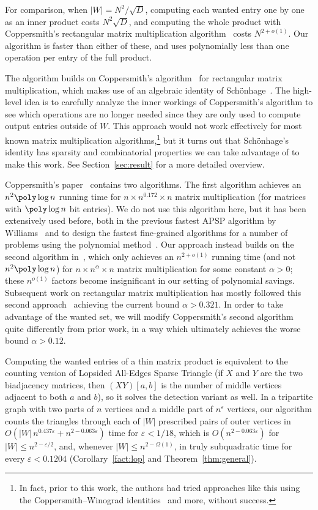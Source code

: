 For comparison, when $|W| = N^2/\sqrt D$, computing each wanted entry one by one as an inner product costs $N^2\sqrt D$, and computing the whole product with Coppersmith's rectangular matrix multiplication algorithm~\cite{Cop82} costs $N^{2+o(1)}$. Our algorithm is faster than either of these, and uses polynomially less than one operation per entry of the full product.

The algorithm builds on Coppersmith's algorithm~\cite{Cop82} for rectangular matrix multiplication, which makes use of an algebraic identity of Sch\"onhage~\cite{Sch81}. The high-level idea is to carefully analyze the inner workings of Coppersmith's algorithm to see which operations are no longer needed since they are only used to compute output entries outside of $W$. This approach would not work effectively for most known matrix multiplication algorithms,\footnote{In fact, prior to this work, the authors had tried approaches like this using the Coppersmith--Winograd identities~\cite{CW90} and more, without success.} but it turns out that Sch\"onhage's identity has sparsity and combinatorial properties we can take advantage of to make this work. See Section~\ref{sec:result} for a more detailed overview.


Coppersmith's paper~\cite{Cop82} contains two algorithms. The first algorithm achieves an $n^2\poly\log n$ running time for $n\times n^{0.172}\times n$ matrix multiplication (for matrices with $\poly\log n$ bit entries). We do not use this algorithm here, but it has been extensively used before, both in the previous fastest APSP algorithm by Williams~\cite{Wil18} and to design the fastest fine-grained algorithms for a number of problems using the polynomial method~\cite{Wil14,AWY15,AW15,CW21,ACW16,ACW20}. Our approach instead builds on the second algorithm in~\cite{Cop82}, which only achieves an $n^{2+o(1)}$ running time (and not $n^2\poly\log n$) for $n\times n^\alpha\times n$ matrix multiplication for some constant $\alpha>0$; these $n^{o(1)}$ factors become insignificant in our setting of polynomial savings. Subsequent work on rectangular matrix multiplication has mostly followed this second approach~\cite{Cop97,LeG12,LU18,VXXZ24} achieving the current bound $\alpha > 0.321$. In order to take advantage of the wanted set, we will modify Coppersmith's second algorithm quite differently from prior work, in a way which ultimately achieves the worse bound $\alpha>0.12$.

Computing the wanted entries of a thin matrix product is equivalent to the counting version of Lopsided All-Edges Sparse Triangle (if $X$ and $Y$ are the two biadjacency matrices, then $(XY)[a,b]$ is the number of middle vertices adjacent to both $a$ and $b$), so it solves the detection variant as well. In a tripartite graph with two parts of $n$ vertices and a middle part of $n^{\varepsilon}$ vertices, our algorithm counts the triangles through each of $|W|$ prescribed pairs of outer vertices in $O(|W|\,n^{0.437\varepsilon}+n^{2-0.063\varepsilon})$ time for $\varepsilon<1/18$, which is $O(n^{2-0.063\varepsilon})$ for $|W|\le n^{2-\varepsilon/2}$, and, whenever $|W|\le n^{2-\Omega(1)}$, in truly subquadratic time for every $\varepsilon<0.1204$ (Corollary~\ref{fact:lop} and Theorem~\ref{thm:general}).

